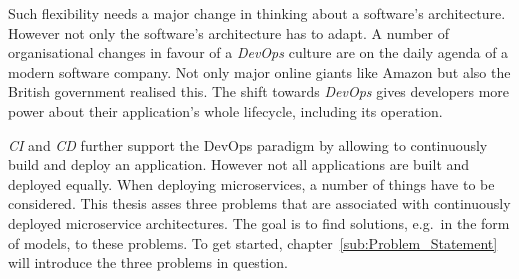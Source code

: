 Such flexibility needs a major change in thinking about a software's
architecture. However not only the software's architecture has to adapt. A
number of organisational changes in favour of a \textit{DevOps} culture are on
the daily agenda of a modern software company. Not only major online giants
like Amazon \autocite{JenkinsVelocityCulture2011} but also the British
government \autocite{LoweLeadingwaymicroservices2016} realised this. The shift
towards \textit{DevOps} gives developers more power about
their application's whole lifecycle, including its operation. 

\textit{\acf{CI}} and \textit{\acf{CD}} further support the DevOps paradigm by
allowing to continuously build and deploy an application. However not all
applications are built and deployed equally. When deploying microservices, a
number of things have to be considered. This thesis asses  three problems that are associated with continuously
deployed microservice architectures. The goal is to find solutions, e.g.\ in
the form of models, to these problems. To get started,
chapter~\ref{sub:Problem_Statement} will introduce the three problems in
question.
